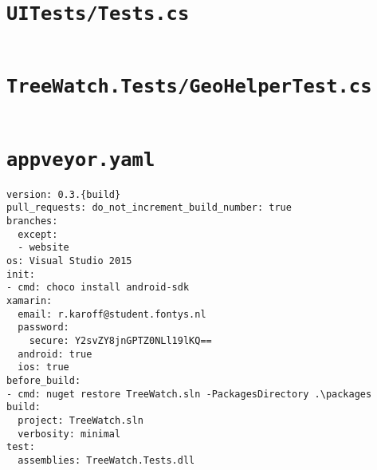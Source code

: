 \documentclass[12pt]{article}
\begin{document}
\section{\texttt{UITests/Tests.cs}}
	\inputminted[linenos,firstline=22]{csharp}{../../../src/UITests/Tests.cs}
	\pagebreak

\section{\texttt{TreeWatch.Tests/GeoHelperTest.cs}}
	\inputminted[linenos,firstline=22]{csharp}{../../../src/TreeWatch.Tests/GeoHelperTest.cs}
	\pagebreak

\section{\texttt{appveyor.yaml}}
\begin{verbatim}
version: 0.3.{build}
pull_requests: do_not_increment_build_number: true
branches:
  except:
  - website
os: Visual Studio 2015
init:
- cmd: choco install android-sdk
xamarin:
  email: r.karoff@student.fontys.nl
  password:
    secure: Y2svZY8jnGPTZ0NLl19lKQ==
  android: true
  ios: true
before_build:
- cmd: nuget restore TreeWatch.sln -PackagesDirectory .\packages
build:
  project: TreeWatch.sln
  verbosity: minimal
test:
  assemblies: TreeWatch.Tests.dll
\end{verbatim}
\end{document}
